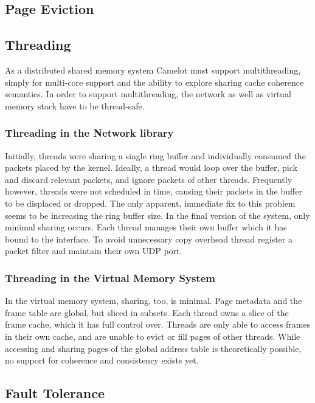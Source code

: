 \subsection{Page Eviction} 

\subsection{Threading} 
As a distributed shared memory system Camelot must support multithreading, simply for multi-core support and the ability to explore sharing cache coherence semantics.
In order to support multithreading, the network as well as virtual memory stack have to be thread-safe.
\subsubsection{Threading in the Network library}
Initially, threads were sharing a single ring buffer and individually consumed the packets placed by the kernel. Ideally, a thread would loop over the buffer, pick and discard relevant packets, and ignore packets of other threads. Frequently however, threads were not scheduled in time, causing their packets in the buffer to be displaced or dropped. The only apparent, immediate fix to this problem seems to be increasing the ring buffer size.
In the final version of the system, only minimal sharing occurs. Each thread manages their own buffer which it has bound to the interface. To avoid unnecessary copy overhead thread register a packet filter and maintain their own UDP port.

\subsubsection{Threading in the Virtual Memory System}
In the virtual memory system,  sharing, too, is minimal. Page metadata and the frame table are global, but sliced in subsets. Each thread owns a slice of the frame cache, which it has full control over. Threads are only able to access frames in their own cache, and are unable to evict or fill pages of other threads. While accessing and sharing pages of the global address table is theoretically possible, no support for coherence and consistency exists yet. 



\subsection{Fault Tolerance} 



